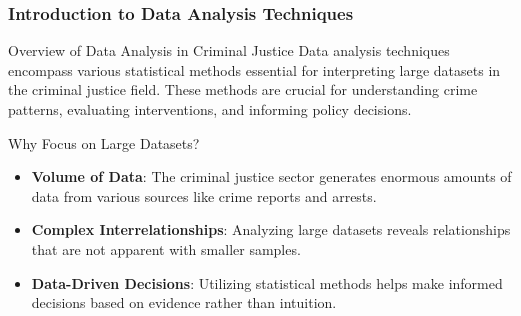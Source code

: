 \documentclass[aspectratio=169]{beamer}
\begin{document}
\frame{\titlepage}

\begin{frame}[fragile]
    \frametitle{Introduction to Data Analysis Techniques}
    \begin{block}{Overview of Data Analysis in Criminal Justice}
        Data analysis techniques encompass various statistical methods essential for interpreting large datasets in the criminal justice field. These methods are crucial for understanding crime patterns, evaluating interventions, and informing policy decisions.
    \end{block}
    
    \begin{block}{Why Focus on Large Datasets?}
        \begin{itemize}
            \item \textbf{Volume of Data}: The criminal justice sector generates enormous amounts of data from various sources like crime reports and arrests.
            \item \textbf{Complex Interrelationships}: Analyzing large datasets reveals relationships that are not apparent with smaller samples.
            \item \textbf{Data-Driven Decisions}: Utilizing statistical methods helps make informed decisions based on evidence rather than intuition.
        \end{itemize}
    \end{block}
\end{frame}
\end{document}
